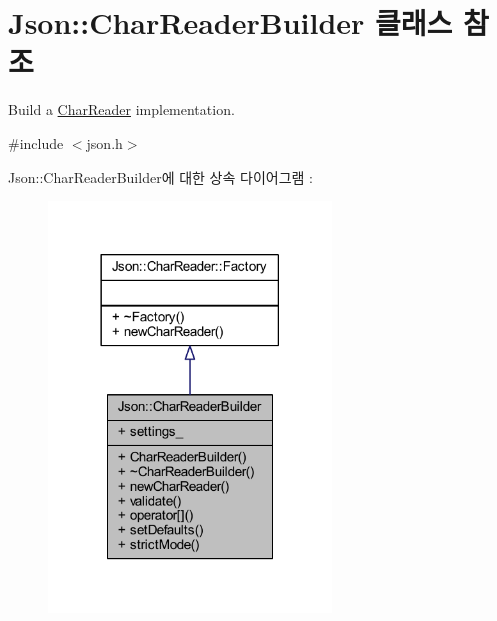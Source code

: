 \hypertarget{class_json_1_1_char_reader_builder}{}\section{Json\+:\+:Char\+Reader\+Builder 클래스 참조}
\label{class_json_1_1_char_reader_builder}


Build a \hyperlink{class_json_1_1_char_reader}{Char\+Reader} implementation.  




{\ttfamily \#include $<$json.\+h$>$}



Json\+:\+:Char\+Reader\+Builder에 대한 상속 다이어그램 \+: \nopagebreak
\begin{figure}[H]
\begin{center}
\leavevmode
\includegraphics[width=213pt]{class_json_1_1_char_reader_builder__inherit__graph}
\end{center}
\end{figure}


